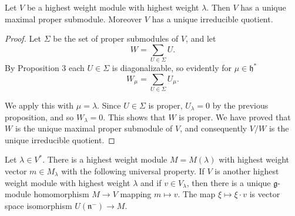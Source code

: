 \documentclass[12pt]{article}
\begin{document}
\begin{proposition}
    Let $V$ be a highest weight module with highest weight $\lambda$. Then $V$ has a unique maximal proper submodule. Moreover $V$ has a unique irreducible quotient.
\end{proposition}

\begin{proof}
    Let $\Sigma$ be the set of proper submodules of $V$, and let
    \[
        W = \sum_{U \in \Sigma} U.
    \]
    By Proposition 3 each $U \in \Sigma$ is diagonalizable, so evidently for $\mu \in \mathfrak{h}^*$
    \[
        W_\mu = \sum_{U \in \Sigma} U_\mu.
    \]

    We apply this with $\mu = \lambda$. Since $U \in \Sigma$ is proper, $U_\lambda = 0$ by the previous proposition, and so $W_\lambda = 0$. This shows that $W$ is proper. We have proved that $W$ is the unique maximal proper submodule of $V$, and consequently $V/W$ is the unique irreducible quotient.
\end{proof}

\begin{theorem}
    Let $\lambda \in V^*$. There is a highest weight module $M = M(\lambda)$ with highest weight vector $m \in M_\lambda$ with the following universal property. If $V$ is another highest weight module with highest weight $\lambda$ and if $v \in V_\lambda$, then there is a unique $\mathfrak{g}$-module homomorphism $M \to V$ mapping $m \mapsto v$. The map $\xi \mapsto \xi \cdot v$ is vector space isomorphism $U(\mathfrak{n}^-) \to M$.
\end{theorem}
\end{document}
